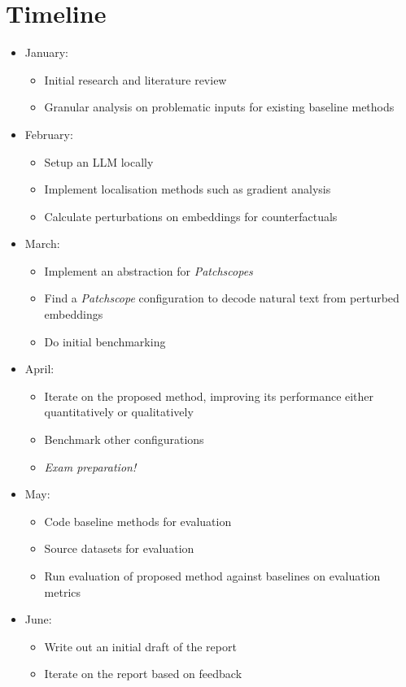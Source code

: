 \section{Timeline}
\begin{itemize}
    \item January:
            \begin{itemize}
            \item Initial research and literature review
            \item Granular analysis on problematic inputs for existing baseline methods
        \end{itemize}
    \item February:
            \begin{itemize}
            \item Setup an LLM locally
            \item Implement localisation methods such as gradient analysis
            \item Calculate perturbations on embeddings for counterfactuals
        \end{itemize}
    \item March:
            \begin{itemize}
            \item Implement an abstraction for \textit{Patchscopes}
            \item Find a \textit{Patchscope} configuration to decode natural text from perturbed embeddings
            \item Do initial benchmarking
        \end{itemize}
    \item April:
            \begin{itemize}
            \item Iterate on the proposed method, improving its performance either quantitatively or qualitatively
            \item Benchmark other configurations
            \item \textit{Exam preparation!}
        \end{itemize}
    \item May:
        \begin{itemize}
            \item Code baseline methods for evaluation
            \item Source datasets for evaluation
            \item Run evaluation of proposed method against baselines on evaluation metrics
        \end{itemize}
    \item June:
        \begin{itemize}
            \item Write out an initial draft of the report
            \item Iterate on the report based on feedback
        \end{itemize}
\end{itemize}